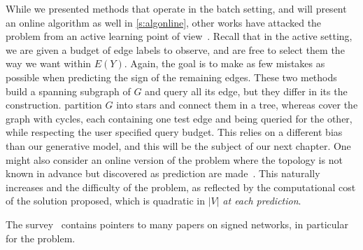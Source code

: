 While we presented methods that operate in the batch setting, and will present an online algorithm
as well in \autoref{s:algonline}, other works have attacked the \esp{} problem from an active
learning point of view~\autocites{Cesa-Bianchi2012a}{Cesa-Bianchi2012b}.  Recall that in the active
setting, we are given a budget of edge labels to observe, and are free to select them the way we
want within $E(Y)$. Again, the goal is to make as few mistakes as possible when predicting the sign
of the remaining edges. These two methods build a spanning subgraph of $G$ and query all its edge,
but they differ in its the construction. \Textcite{Cesa-Bianchi2012a} partition $G$ into stars and
connect them in a tree, whereas \textcite{Cesa-Bianchi2012b} cover the graph with cycles, each
containing one test edge and being queried for the other, while respecting the user specified query
budget.  This relies on a different bias than our generative model, and this will be the subject of
our next chapter.  One might also consider an online version of the problem where the topology is
not known in advance but discovered as prediction are made~\autocite{Gentile2013}. This naturally
increases and the difficulty of the problem, as reflected by the computational cost of the solution
proposed, which is quadratic in $|V|$ \emph{at each prediction}.

The survey~\autocite{Tang2015a} contains pointers to many papers on signed networks, in particular
for the \esp{} problem.
